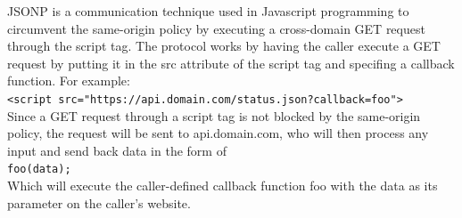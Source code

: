\documentclass[addpoints,answers]{exam}
\begin{document}
\begin{questions}

\pagebreak


JSONP is a communication technique used in Javascript programming to
circumvent the same-origin policy by executing a cross-domain GET
request through the script tag.  The protocol works by having the
caller execute a GET request by putting it in the src attribute of the
script tag and specifing a callback function.  For example: \\

\texttt{<script src="https://api.domain.com/status.json?callback=foo">}\\

Since a GET request through a script tag is not blocked by the
same-origin policy, the request will be sent to api.domain.com, who
will then process any input and send back data in the form of\\

\texttt{foo(data);}\\

Which will execute the caller-defined callback function foo with the data as its parameter on the caller's website.


\end{questions}
\end{document}
